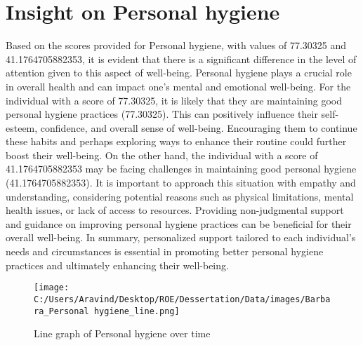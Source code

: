 \documentclass[10pt, a4paper]{article}%
\begin{document}
\section{Insight on Personal hygiene}%
\label{sec:InsightonPersonalhygiene}%
Based on the scores provided for Personal hygiene, with values of 77.30325 and 41.1764705882353, it is evident that there is a significant difference in the level of attention given to this aspect of well{-}being. Personal hygiene plays a crucial role in overall health and can impact one's mental and emotional well{-}being.\newline%
\newline%
For the individual with a score of 77.30325, it is likely that they are maintaining good personal hygiene practices (77.30325). This can positively influence their self{-}esteem, confidence, and overall sense of well{-}being. Encouraging them to continue these habits and perhaps exploring ways to enhance their routine could further boost their well{-}being.\newline%
\newline%
On the other hand, the individual with a score of 41.1764705882353 may be facing challenges in maintaining good personal hygiene (41.1764705882353). It is important to approach this situation with empathy and understanding, considering potential reasons such as physical limitations, mental health issues, or lack of access to resources. Providing non{-}judgmental support and guidance on improving personal hygiene practices can be beneficial for their overall well{-}being.\newline%
\newline%
In summary, personalized support tailored to each individual's needs and circumstances is essential in promoting better personal hygiene practices and ultimately enhancing their well{-}being.%


\begin{figure}[H]%
\centering%
\texttt{[image: C:/Users/Aravind/Desktop/ROE/Dessertation/Data/images/Barbara\_Personal hygiene\_line.png]}%
\caption{Line graph of Personal hygiene over time}%
\end{figure}

%
\end{document}
